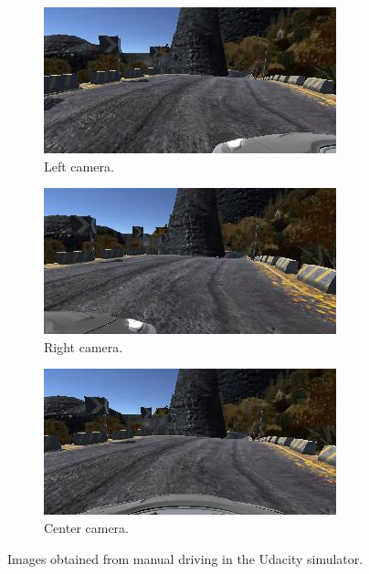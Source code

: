 \documentclass[conference]{IEEEtran}
\begin{document}
\begin{figure}[h]
	\centering
	\begin{subfigure}{0.22\textwidth} 
		\includegraphics[width=\textwidth]{img/left}
		\caption{Left camera.} 
	\end{subfigure}
	\begin{subfigure}{0.22\textwidth} 
		\includegraphics[width=\textwidth]{img/right}
		\caption{Right camera.} 
	\end{subfigure}
	\begin{subfigure}{0.22\textwidth} 
		\includegraphics[width=\textwidth]{img/center}
		\caption{Center camera.} 
	\end{subfigure}
	\caption{Images obtained from manual driving in the Udacity simulator.} 
	\label{fig:cameras}
\end{figure}
\end{document}
